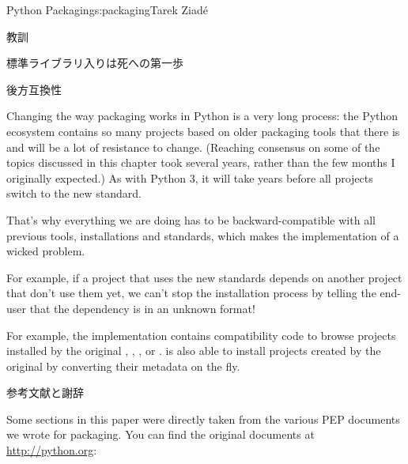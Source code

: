 \begin{aosachapter}{Python Packaging}{s:packaging}{Tarek Ziad\'{e}}
\begin{aosasect1}{教訓}
\begin{aosasect2}{標準ライブラリ入りは死への第一歩}
\end{aosasect2}

\begin{aosasect2}{後方互換性}

Changing the way packaging works in Python is a very long process: the
Python ecosystem contains so many projects based on older packaging
tools that there is and will be a lot of resistance to change.
(Reaching consensus on some of the topics discussed in this chapter
took several years, rather than the few months I originally
expected.)  As with Python 3, it will take years before all projects
switch to the new standard.

That's why everything we are doing has to be backward-compatible with 
all previous tools, installations and standards, which makes the 
implementation of  a wicked problem.

For example, if a project that uses the new standards depends on 
another project that don't use them yet, we can't stop the installation
process by telling the end-user that the dependency is in an unknown 
format!

For example, the  implementation contains compatibility code 
to browse projects installed by the original ,
, , or .
 is also able to install projects created by the
original  by converting their metadata on the fly.

\end{aosasect2}


\end{aosasect1}

\begin{aosasect1}{参考文献と謝辞}

Some sections in this paper were directly taken from the various PEP
documents we wrote for packaging. You can find the original documents
at \url{http://python.org}:


\end{aosasect1}
\end{aosachapter}
